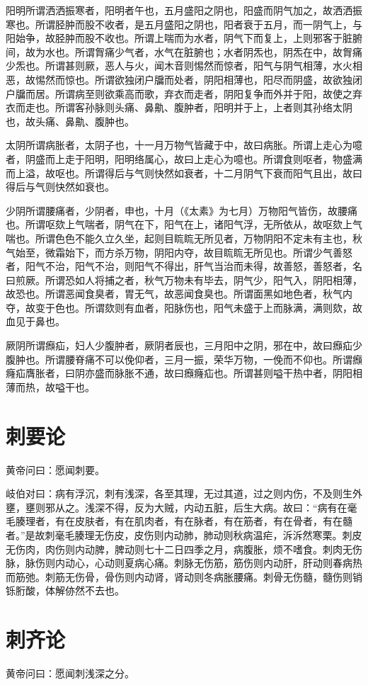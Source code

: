 \documentclass{article}%
\begin{document}
阳明所谓洒洒振寒者，阳明者午也，五月盛阳之阴也，阳盛而阴气加之，故洒洒振寒也。所谓胫肿而股不收者，是五月盛阳之阴也，阳者衰于五月，而一阴气上，与阳始争，故胫肿而股不收也。所谓上喘而为水者，阴气下而复上，上则邪客于脏腑间，故为水也。所谓胷痛少气者，水气在脏腑也；水者阴炁也，阴炁在中，故胷痛少炁也。所谓甚则厥，恶人与火，闻木音则惕然而惊者，阳气与阴气相薄，水火相恶，故惕然而惊也。所谓欲独闭户牖而处者，阴阳相薄也，阳尽而阴盛，故欲独闭户牖而居。所谓病至则欲乘高而歌，弃衣而走者，阴阳复争而外并于阳，故使之弃衣而走也。所谓客孙脉则头痛、鼻鼽、腹肿者，阳明并于上，上者则其孙络太阴也，故头痛、鼻鼽、腹肿也。

太阴所谓病胀者，太阴子也，十一月万物气皆藏于中，故曰病胀。所谓上走心为噫者，阴盛而上走于阳明，阳明络属心，故曰上走心为噫也。所谓食则呕者，物盛满而上溢，故呕也。所谓得后与气则快然如衰者，十二月阴气下衰而阳气且出，故曰得后与气则快然如衰也。

少阴所谓腰痛者，少阴者，申也，十月（《太素》为七月）万物阳气皆伤，故腰痛也。所谓呕欬上气喘者，阴气在下，阳气在上，诸阳气浮，无所依从，故呕欬上气喘也。所谓色色不能久立久坐，起则目䀮䀮无所见者，万物阴阳不定未有主也，秋气始至，微霜始下，而方杀万物，阴阳内夺，故目䀮䀮无所见也。所谓少气善怒者，阳气不治，阳气不治，则阳气不得出，肝气当治而未得，故善怒，善怒者，名曰煎厥。所谓恐如人将捕之者，秋气万物未有毕去，阴气少，阳气入，阴阳相薄，故恐也。所谓恶闻食臭者，胃无气，故恶闻食臭也。所谓面黑如地色者，秋气内夺，故变于色也。所谓欬则有血者，阳脉伤也，阳气未盛于上而脉满，满则欬，故血见于鼻也。

厥阴所谓㿗疝，妇人少腹肿者，厥阴者辰也，三月阳中之阴，邪在中，故曰㿗疝少腹肿也。所谓腰脊痛不可以俛仰者，三月一振，荣华万物，一俛而不仰也。所谓㿗癃疝膺胀者，曰阴亦盛而脉胀不通，故曰㿗癃疝也。所谓甚则嗌干热中者，阴阳相薄而热，故嗌干也。
\section{刺要论}
黄帝问曰：愿闻刺要。

岐伯对曰：病有浮沉，刺有浅深，各至其理，无过其道，过之则内伤，不及则生外壅，壅则邪从之。浅深不得，反为大贼，内动五脏，后生大病。故曰：“病有在毫毛腠理者，有在皮肤者，有在肌肉者，有在脉者，有在筋者，有在骨者，有在髓者。”是故刺毫毛腠理无伤皮，皮伤则内动肺，肺动则秋病温疟，泝泝然寒栗。刺皮无伤肉，肉伤则内动脾，脾动则七十二日四季之月，病腹胀，烦不嗜食。刺肉无伤脉，脉伤则内动心，心动则夏病心痛。刺脉无伤筋，筋伤则内动肝，肝动则春病热而筋弛。刺筋无伤骨，骨伤则内动肾，肾动则冬病胀腰痛。刺骨无伤髓，髓伤则销铄胻酸，体解㑊然不去也。
\section{刺齐论}
黄帝问曰：愿闻刺浅深之分。
\end{document}
